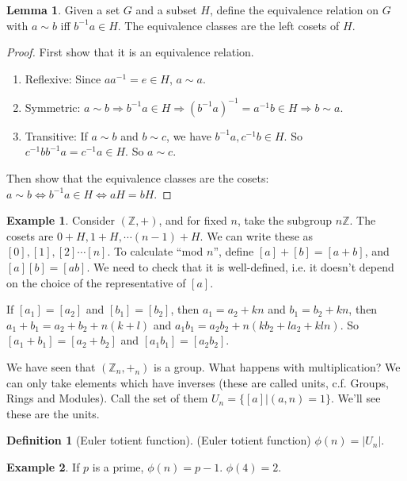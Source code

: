 \documentclass[a4paper]{article}
\theoremstyle{definition}
\newtheorem*{defi}{Definition}
\newtheorem*{eg}{Example}
\newtheorem*{lemma}{Lemma}
\newcommand{\Z}{\mathbb{Z}}
\begin{document}
\begin{lemma}
  Given a set $G$ and a subset $H$, define the equivalence relation on $G$ with $a\sim b$ iff $b^{-1}a\in H$. The equivalence classes are the left cosets of $H$.
\end{lemma}

\begin{proof}
  First show that it is an equivalence relation.
  \begin{enumerate}
  \item Reflexive: Since $aa^{-1} = e\in H$,  $a\sim a$.
  \item Symmetric: $a\sim b\Rightarrow b^{-1}a\in H \Rightarrow (b^{-1}a)^{-1} = a^{-1}b\in H\Rightarrow b\sim a$.
  \item Transitive: If $a\sim b$ and $b\sim c$, we have $b^{-1}a, c^{-1}b\in H$. So $c^{-1}bb^{-1}a = c^{-1}a\in H$. So $a\sim c$.
  \end{enumerate}
  Then show that the equivalence classes are the cosets: $a\sim b\Leftrightarrow b^{-1}a\in H \Leftrightarrow aH = bH$.
\end{proof}

\begin{eg}
 Consider $(\Z, +)$, and for fixed $n$, take the subgroup $n\Z$. The cosets are $0+ H, 1 + H, \cdots (n - 1)+H$. We can write these as $[0], [1], [2] \cdots [n]$. To calculate ``mod $n$'', define $[a] + [b] = [a + b]$, and $[a][b] = [ab]$. We need to check that it is well-defined, i.e. it doesn't depend on the choice of the representative of $[a]$.

If $[a_1] = [a_2]$ and $[b_1] = [b_2]$, then $a_1 = a_2 + kn$ and $b_1 = b_2 + kn$, then $a_1 + b_1 = a_2 + b_2 + n(k + l)$ and $a_1b_1 = a_2b_2 + n(kb_2 +la_2 + kln)$. So $[a_1 + b_1] = [a_2 + b_2]$ and $[a_1b_1] = [a_2b_2]$.
\end{eg}

We have seen that $(\Z_n, +_n)$ is a group. What happens with multiplication? We can only take elements which have inverses (these are called units, c.f. Groups, Rings and Modules). Call the set of them $U_n = \{[a] | (a, n) = 1\}$. We'll see these are the units.
\begin{defi}[Euler totient function]
  (Euler totient function) $\phi (n) = |U_n|$.
\end{defi}

\begin{eg}
  If $p$ is a prime, $\phi(n) = p - 1$. $\phi(4) = 2$.
\end{eg}
\end{document}
